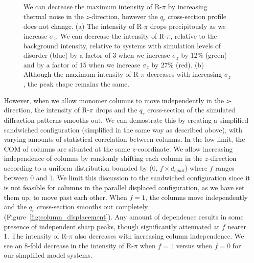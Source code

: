 \documentclass[journal=jpcbfk,manuscript=article]{achemso}
\begin{document}
\begin{figure}[!htb]
\begin{subfigure}{0.49\textwidth}
  \caption{}\label{fig:rpi_xsection_vs_zsigma}
  \end{subfigure}
  \caption{We can decrease the maximum intensity of R-$\pi$ by increasing
  thermal noise in the $z$-direction, however the $q_r$ cross-section profile does
  not change. (a) The intensity of R-$\pi$ drops precipitously as we increase
  $\sigma_z$. We can decrease the intensity of R-$\pi$, relative to the
  background intensity, relative to systems with simulation levels of disorder (blue)
  by a factor of 3 when we
  increase $\sigma_z$ by 12\% (green) and by a factor of 15 when we increase
  $\sigma_z$ by 27\% (red). (b) Although the maximum intensity of R-$\pi$
  decreases with increasing $\sigma_z$, the peak shape remains the same.}\label{fig:znoise}
  \end{figure}
  
  However, when we allow monomer columns to move independently in the
  $z$-direction, the intensity of R-$\pi$ drops and the $q_r$ cross-section of
  the simulated diffraction patterns smooths out. We can demostrate this by
  creating a simplified sandwiched configuration (simplified in the same way as
  described above), 
  with varying amounts of statistical correlation between columns. In the low
  limit, the COM of columns are situated at the same $z$-coordinate.
  We allow increasing independence of columns by randomly shifting each column in
  the $z$-direction according to a uniform distribution bounded by (0, $f \times
  \mathit{d}_{equil}$) where $f$ ranges between 0 and 1. We limit this discussion
  to the sandwiched configuration since it is not feasible for columns in the
  parallel displaced configuration, as we have set them up, to move past each
  other. When $f = 1$, the columns move independently and the $q_r$ cross-section
  smooths out completely (Figure~\ref{fig:column_displacement}). Any amount of
  dependence results in some presence of independent sharp peaks, though
  significantly attenuated at $f$ nearer 1. The intensity of R-$\pi$ also
  decreases with increasing column independence. We see an 8-fold decrease in the
  intensity of R-$\pi$ when $f=1$ versus when $f=0$ for our simplified model
  systems.
\end{document}
